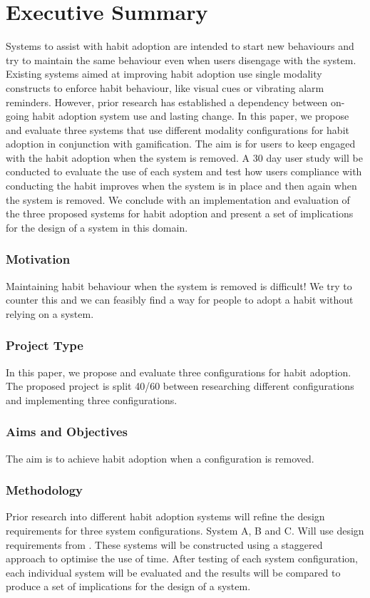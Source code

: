 

\section{Executive Summary}
Systems to assist with habit adoption are intended to start new behaviours and try to maintain the same behaviour even when users disengage with the system. Existing systems aimed at improving habit adoption use single modality constructs to enforce habit behaviour, like visual cues or vibrating alarm reminders. However, prior research has established a dependency between on-going habit adoption system use and lasting change. In this paper, we propose and evaluate three systems that use different modality configurations for habit adoption in conjunction with gamification. The aim is for users to keep engaged with the habit adoption when the system is removed. A 30 day user study will be conducted to evaluate the use of each system and test how users compliance with conducting the habit improves when the system is in place and then again when the system is removed. We conclude with an implementation and evaluation of the three proposed systems for habit adoption and present a set of implications for the design of a system in this domain.

\subsubsection*{Motivation}
Maintaining habit behaviour when the system is removed is difficult! We try to counter this and we can feasibly find a way for people to adopt a habit without relying on a system. 


\subsubsection*{Project Type}
In this paper, we propose and evaluate three configurations for habit adoption.
The proposed project is split 40/60 between researching different configurations and implementing three configurations.


\subsubsection*{Aims and Objectives}
The aim is to achieve habit adoption when a configuration is removed.


\subsubsection*{Methodology}
Prior research into different habit adoption systems will refine the design requirements for three system configurations. System A, B and C.\newline
Will use design requirements from \cite{article_dont_forget_your_pill}.
These systems will be constructed using a staggered approach to optimise the use of time.
After testing of each system configuration, each individual system will be evaluated and the results will be compared to produce a set of implications for the design of a system.


